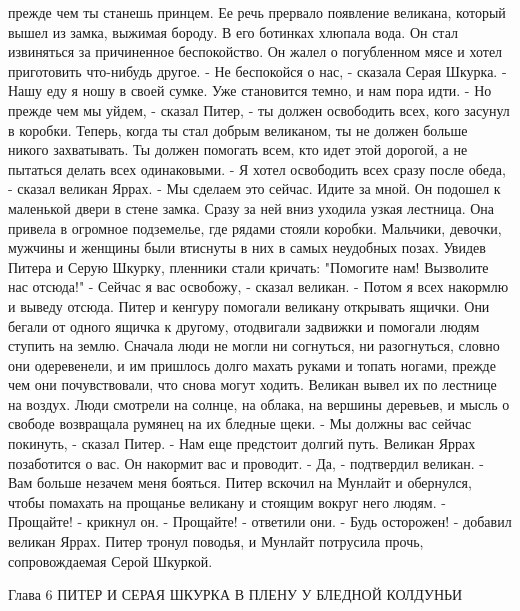 прежде чем ты станешь принцем.
    Ее речь прервало появление великана, который вышел из замка, 
выжимая бороду. В его ботинках хлюпала вода. Он стал извиняться за 
причиненное беспокойство. Он жалел о погубленном мясе и хотел 
приготовить что-нибудь другое.
    - Не беспокойся о нас, - сказала Серая Шкурка. - Нашу еду я ношу в 
своей сумке. Уже становится темно, и нам пора идти.
    - Но прежде чем мы уйдем, - сказал Питер, - ты должен освободить 
всех, кого засунул в коробки. Теперь, когда ты стал добрым великаном, 
ты не должен больше никого захватывать. Ты должен помогать всем, кто 
идет этой дорогой, а не пытаться делать всех одинаковыми.
    - Я хотел освободить всех сразу после обеда, - сказал великан 
Яррах. - Мы сделаем это сейчас. Идите за мной.
    Он подошел к маленькой двери в стене замка. Сразу за ней вниз 
уходила узкая лестница. Она привела в огромное подземелье, где рядами 
стояли коробки. Мальчики, девочки, мужчины и женщины были втиснуты в 
них в самых неудобных позах. Увидев Питера и Серую Шкурку, пленники 
стали кричать: "Помогите нам! Вызволите нас отсюда!"
    - Сейчас я вас освобожу, - сказал великан. - Потом я всех накормлю 
и выведу отсюда.
    Питер и кенгуру помогали великану открывать ящички. Они бегали от 
одного ящичка к другому, отодвигали задвижки и помогали людям ступить 
на землю. Сначала люди не могли ни согнуться, ни разогнуться, словно 
они одеревенели, и им пришлось долго махать руками и топать ногами, 
прежде чем они почувствовали, что снова могут ходить. Великан вывел их 
по лестнице на воздух. Люди смотрели на солнце, на облака, на вершины 
деревьев, и мысль о свободе возвращала румянец на их бледные щеки.
    - Мы должны вас сейчас покинуть, - сказал Питер. - Нам еще 
предстоит долгий путь. Великан Яррах позаботится о вас. Он накормит 
вас и проводит.
    - Да, - подтвердил великан. - Вам больше незачем меня бояться.
    Питер вскочил на Мунлайт и обернулся, чтобы помахать на прощанье 
великану и стоящим вокруг него людям.
    - Прощайте! - крикнул он.
    - Прощайте! - ответили они.
    - Будь осторожен! - добавил великан Яррах. Питер тронул поводья, и 
Мунлайт потрусила прочь, сопровождаемая Серой Шкуркой.

        Глава 6
        ПИТЕР И СЕРАЯ ШКУРКА
        В ПЛЕНУ У БЛЕДНОЙ КОЛДУНЬИ

